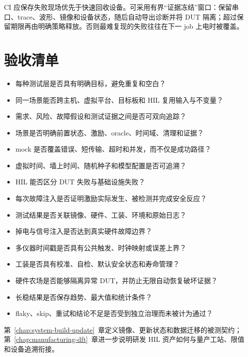 CI 应保存失败现场优先于快速回收设备。可采用有界“证据冻结”窗口：保留串口、trace、波形、镜像和设备状态，随后自动导出诊断并将 DUT 隔离；超过保留期限再由明确策略释放。否则最难复现的失败往往在下一 job 上电时被覆盖。

\section{验收清单}

\begin{itemize}
  \item 每种测试层是否具有明确目标，避免重复和空白？
  \item 同一场景能否跨主机、虚拟平台、目标板和 HIL 复用输入与不变量？
  \item 需求、风险、故障假设和测试证据之间是否可双向追踪？
  \item 场景是否明确前置状态、激励、oracle、时间域、清理和证据？
  \item mock 是否覆盖错误、短传输、超时和并发，而不仅是成功路径？
  \item 虚拟时间、墙上时间、随机种子和模型配置是否可追溯？
  \item HIL 能否区分 DUT 失败与基础设施失败？
  \item 每次故障注入是否证明激励实际发生、被检测并完成安全反应？
  \item 测试结果是否关联镜像、硬件、工装、环境和原始日志？
  \item 掉电与信号注入是否达到真实硬件故障边界？
  \item 多仪器时间戳是否具有公共触发、时钟映射或误差上界？
  \item 工装是否具有校准、自检、默认安全状态和寿命管理？
  \item 硬件农场是否能够隔离异常 DUT，并防止无限自动恢复破坏证据？
  \item 长稳结果是否保存趋势、最大值和统计条件？
  \item flaky、skip、重试和结论不足是否受到独立治理而未被计为通过？
\end{itemize}

第~\ref{chap:system-build-update}~章定义镜像、更新状态和数据迁移的被测契约；第~\ref{chap:manufacturing-dft}~章进一步说明研发 HIL 资产如何与量产工站、限值和设备追溯衔接。
